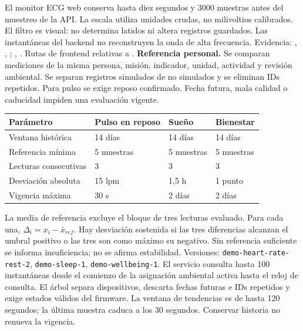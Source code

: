 El monitor ECG web conserva hasta diez segundos y 3000 muestras antes del muestreo de la API. La escala utiliza unidades crudas, no milivoltios calibrados. El filtro es visual: no determina latidos ni altera registros guardados. Las instantáneas del backend no reconstruyen la onda de alta frecuencia.
\vfill
{\footnotesize\color{muted}Evidencia: , , ; , . Rutas de frontend relativas a .}
\newpage
{}
\textbf{Referencia personal.} Se comparan mediciones de la misma persona, misión, indicador, unidad, actividad y revisión ambiental. Se separan registros simulados de no simulados y se eliminan IDs repetidos. Para pulso se exige reposo confirmado. Fecha futura, mala calidad o caducidad impiden una evaluación vigente.
\par\noindent\begin{tabularx}{\linewidth}{@{}lXXX@{}}
\toprule Parámetro & Pulso en reposo & Sueño & Bienestar\\\midrule
Ventana histórica & 14 días & 14 días & 14 días\\
Referencia mínima & 5 muestras & 5 muestras & 5 muestras\\
Lecturas consecutivas & 3 & 3 & 3\\
Desviación absoluta & 15 lpm & 1,5 h & 1 punto\\
Vigencia máxima & 30 s & 2 días & 2 días\\\bottomrule
\end{tabularx}\par
La media de referencia excluye el bloque de tres lecturas evaluado. Para cada una, $\Delta_i=x_i-\bar{x}_{ref}$. Hay desviación sostenida si las tres diferencias alcanzan el umbral positivo o las tres son como máximo su negativo. Sin referencia suficiente se informa insuficiencia; no se afirma estabilidad. Versiones: \texttt{demo-heart-rate-rest-2}, \texttt{demo-sleep-1}, \texttt{demo-wellbeing-1}.
El servicio consulta hasta 100 instantáneas desde el comienzo de la asignación ambiental activa hasta el reloj de consulta. El árbol separa dispositivos, descarta fechas futuras e IDs repetidos y exige estados válidos del firmware. La ventana de tendencias es de hasta 120 segundos; la última muestra caduca a los 30 segundos. Conservar historia no renueva la vigencia.
